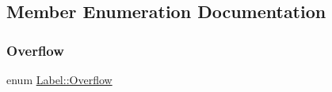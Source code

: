 \subsection{Member Enumeration Documentation}
\mbox{\label{classLabel_af7d31998ea743e8ca64eb1a983fa6a4c}} 
\subsubsection{\texorpdfstring{Overflow}{Overflow}\hspace{0.1cm}{\footnotesize\ttfamily [1/2]}}
{\footnotesize\ttfamily enum \hyperlink{classLabel_af7d31998ea743e8ca64eb1a983fa6a4c}{Label\+::\+Overflow}\hspace{0.3cm}{\ttfamily [strong]}}

